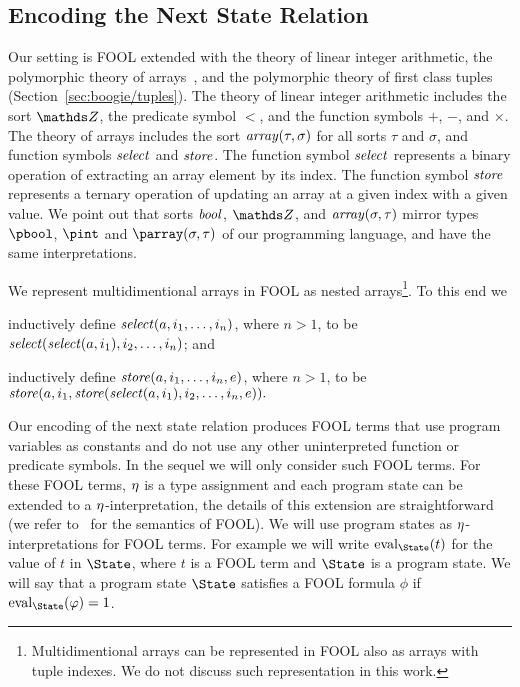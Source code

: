 \subsection{Encoding the Next State Relation}\label{sec:boogie/next-state/encoding}

Our setting is FOOL extended with the theory of linear integer arithmetic, the polymorphic theory of arrays~\cite{VampireAndFOOL}, and the polymorphic theory of first class tuples (Section~\ref{sec:boogie/tuples}). The theory of linear integer arithmetic includes the sort $\Z$, the predicate symbol $<$, and the function symbols $+$, $-$, and $\times$. The theory of arrays includes the sort $\mathit{array}(\tau,\sigma)$ for all sorts $\tau$ and $\sigma$, and function symbols $\mathit{select}$ and $\mathit{store}$. The function symbol $\mathit{select}$ represents a binary operation of extracting an array element by its index. The function symbol $\mathit{store}$ represents a ternary operation of updating an array at a given index with a given value. We point out that sorts $\mathit{bool}$, $\Z$, and $\mathit{array}(\sigma,\tau)$ mirror types $\pbool$, $\pint$ and $\parray(\sigma,\tau)$ of our programming language, and have the same interpretations.

We represent multidimentional arrays in FOOL as nested arrays\footnote{Multidimentional arrays can be represented in FOOL also as arrays with tuple indexes. We do not discuss such representation in this work.}. To this end we
\begin{enumerate*}[label=(\roman*)]
  \item inductively define $\mathit{select}({a},{i_1,\allowbreak\ldots,\allowbreak i_n})$, where $n > 1$, to be $\mathit{select}({\mathit{select}({a},{i_1})},{i_2,\ldots,i_n})$; and
  \item inductively define $\mathit{store}({a},{i_1,\allowbreak\ldots,\allowbreak i_n},{e})$, where $n > 1$, to be $\mathit{store}({a},{i_1},{\mathit{store}({\mathit{select}({a},{i_1})},{i_2,\allowbreak\ldots,\allowbreak i_n},{e})}).$
\end{enumerate*}

Our encoding of the next state relation produces FOOL terms that use program variables as constants and do not use any other uninterpreted function or predicate symbols. In the sequel we will only consider such FOOL terms. For these FOOL terms, $\eta$ is a type assignment and each program state can be extended to a $\eta$-interpretation, the details of this extension are straightforward (we refer to~\cite{FOOL} for the semantics of FOOL). We will use program states as $\eta$-interpretations for FOOL terms. For example we will write $\eval{t}{\State}$ for the value of $t$ in $\State$, where $t$ is a FOOL term and $\State$ is a program state. We will say that a program state $\State$ satisfies a FOOL formula $\phi$ if $\eval{\phi}{\State} = 1$.

